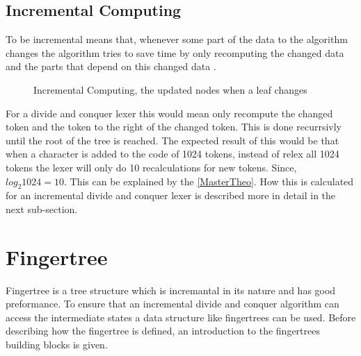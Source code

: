 \subsection{Incremental Computing}
To be incremental means that, whenever some part of the data to the algorithm
changes the algorithm tries to save time by only recomputing the changed data
and the parts that depend on this changed data \cite{incrementalDef}.

\begin{figure}[!htp]
\centering
\caption{Incremental Computing, the updated nodes when a leaf changes \label{fig:incUp}}
\end{figure}

For a divide and conquer lexer this would mean only recompute the changed token
and the token to the right of the changed token. This is done recurrsivly until
the root of the tree is reached. The expected result of this would be that when
a character is added to the code of 1024 tokens, instead of relex all 1024
tokens the lexer will only do 10 recalculations for new tokens. Since,
$log_2 1024 = 10$. This can be explained by the \cref{MasterTheo}. How this is
calculated for an incremental divide and conquer lexer is described more in
detail in the next sub-section.              

\section{Fingertree}
Fingertree is a tree structure which is incremantal in its nature and has good
preformance. To ensure that an incremental divide and conquer algorithm can
access the intermediate states a data structure like fingertrees can be used.
Before describing how the fingertree is defined, an introduction to the
fingertrees building blocks is given.

